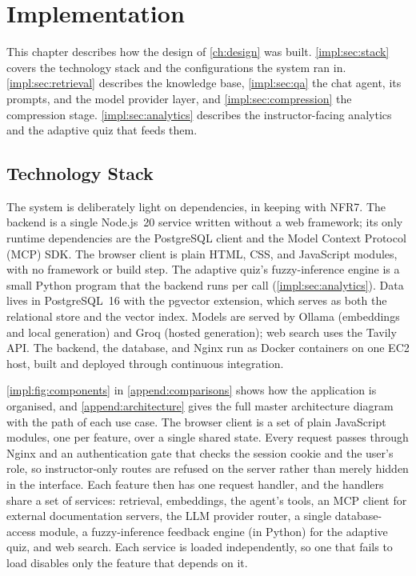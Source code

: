 \chapter{Implementation}
\label{ch:implementation}
\vspace{2em}

This chapter describes how the design of \autoref{ch:design} was built.
\autoref{impl:sec:stack} covers the technology stack and the configurations
the system ran in. \autoref{impl:sec:retrieval} describes the knowledge base,
\autoref{impl:sec:qa} the chat agent, its prompts, and the model provider
layer, and \autoref{impl:sec:compression} the compression stage.
\autoref{impl:sec:analytics} describes the instructor-facing analytics and the
adaptive quiz that feeds them.

\section{Technology Stack}
\label{impl:sec:stack}

The system is deliberately light on dependencies, in keeping with NFR7. The
backend is a single Node.js~20 service written without a web framework; its
only runtime dependencies are the PostgreSQL client and the Model Context
Protocol (MCP) SDK. The browser client is plain HTML, CSS, and JavaScript
modules, with no framework or build step. The adaptive quiz's fuzzy-inference
engine is a small Python program that the backend runs per call
(\autoref{impl:sec:analytics}). Data lives in PostgreSQL~16 with the pgvector
extension, which serves as both the relational store and the vector index.
Models are served by Ollama (embeddings and local generation) and Groq
(hosted generation); web search uses the Tavily API. The backend, the
database, and Nginx run as Docker containers on one EC2 host, built and
deployed through continuous integration.

\autoref{impl:fig:components} in \autoref{append:comparisons} shows how the
application is organised, and \autoref{append:architecture} gives the full
master architecture diagram with the path of each use case. The
browser client is a set of plain JavaScript modules, one per feature, over a
single shared state. Every request passes through Nginx and an
authentication gate that checks the session cookie and the user's role, so
instructor-only routes are refused on the server rather than merely hidden
in the interface. Each feature then has one request handler, and the
handlers share a set of services: retrieval, embeddings, the agent's tools,
an MCP client for external documentation servers, the LLM provider router,
a single database-access module, a fuzzy-inference feedback engine
(in Python) for the adaptive quiz, and web search. Each service is loaded
independently, so one that fails to load disables only the feature that
depends on it.


